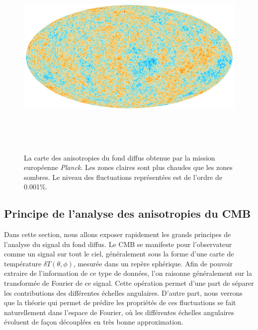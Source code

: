 \begin{figure}[htbp]
	\centering
		\includegraphics[height=10cm]{figs/planck2015.png}
		\caption[Les fluctuations de températures vues par Planck]{La carte des anisotropies du fond diffus obtenue par la mission européenne \textit{Planck}. Les zones claires sont plus chaudes que les zones sombres. Le niveau des fluctuations représentées est de l'ordre de 0.001\%.}
	\label{f:planckmap}
\end{figure}

\subsection{Principe de l'analyse des anisotropies du CMB}
Dans cette section, nous allons exposer rapidement les grands principes de l'analyse du signal du fond diffus. Le CMB se manifeste pour l'observateur comme un signal sur tout le ciel, généralement sous la forme d'une carte de température $\delta T(\theta,\phi)$, mesurée dans un repère sphérique. Afin de pouvoir extraire de l'information de ce type de données, l'on raisonne généralement sur la transformée de Fourier de ce signal. Cette opération permet d'une part de séparer les contributions des différentes échelles angulaires. D'autre part, nous verrons que la théorie qui permet de prédire les propriétés de ces fluctuations se fait naturellement dans l'espace de Fourier, où les différentes échelles angulaires évoluent de façon découplées en très bonne approximation.  

